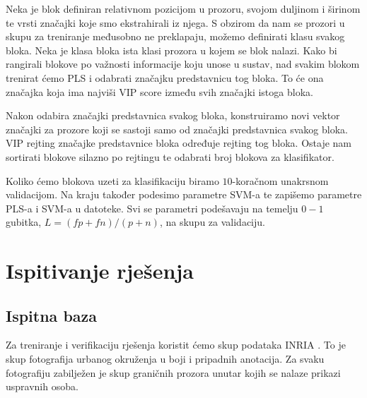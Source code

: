 \documentclass[seminar]{fer}
\begin{document}
Neka je blok definiran relativnom pozicijom u prozoru, svojom duljinom i širinom te vrsti značajki koje smo ekstrahirali iz njega. S obzirom da nam se prozori u skupu za treniranje međusobno ne preklapaju, možemo definirati klasu svakog bloka. Neka je klasa bloka ista klasi prozora u kojem se blok nalazi. Kako bi rangirali blokove po važnosti informacije koju unose u sustav, nad svakim blokom trenirat ćemo PLS i odabrati značajku predstavnicu tog bloka. To će ona značajka koja ima  najviši VIP score između svih značajki istoga bloka.

Nakon odabira značajki predstavnica svakog bloka, konstruiramo novi vektor značajki za prozore koji se sastoji samo od značajki predstavnica svakog bloka. VIP rejting značajke predstavnice bloka određuje rejting tog bloka. Ostaje nam sortirati blokove silazno po rejtingu te odabrati broj blokova za klasifikator. 

Koliko ćemo blokova uzeti za  klasifikaciju biramo $10$-koračnom unakrsnom validacijom.
Na kraju također podesimo parametre SVM-a te zapišemo parametre PLS-a i SVM-a u datoteke. Svi se parametri podešavaju na temelju $0-1$ gubitka, $L = (fp + fn) / (p + n)$, na skupu za validaciju.

\chapter{Ispitivanje rješenja}
\section{Ispitna baza}

Za treniranje i verifikaciju rješenja koristit ćemo skup podataka INRIA \cite{DT05}. To je skup fotografija urbanog okruženja u boji i pripadnih anotacija. Za svaku fotografiju zabilježen je skup graničnih prozora  unutar kojih se nalaze prikazi uspravnih osoba.
\end{document}
